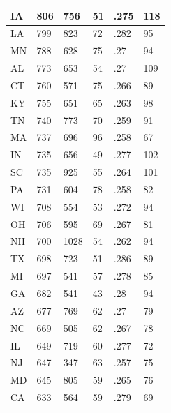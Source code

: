 \begin{table}[htbp]
\begin{tabular}{|l|l|l|l|l|l|}
IA &       806 &       756 &        51 &      .275 &       118 \\ \hline 
LA &       799 &       823 &        72 &      .282 &        95 \\ \hline 
MN &       788 &       628 &        75 &       .27 &        94 \\ \hline 
AL &       773 &       653 &        54 &       .27 &       109 \\ \hline 
CT &       760 &       571 &        75 &      .266 &        89 \\ \hline 
KY &       755 &       651 &        65 &      .263 &        98 \\ \hline 
TN &       740 &       773 &        70 &      .259 &        91 \\ \hline 
MA &       737 &       696 &        96 &      .258 &        67 \\ \hline 
IN &       735 &       656 &        49 &      .277 &       102 \\ \hline 
SC &       735 &       925 &        55 &      .264 &       101 \\ \hline 
PA &       731 &       604 &        78 &      .258 &        82 \\ \hline 
WI &       708 &       554 &        53 &      .272 &        94 \\ \hline 
OH &       706 &       595 &        69 &      .267 &        81 \\ \hline 
NH &       700 &      1028 &        54 &      .262 &        94 \\ \hline 
TX &       698 &       723 &        51 &      .286 &        89 \\ \hline 
MI &       697 &       541 &        57 &      .278 &        85 \\ \hline 
GA &       682 &       541 &        43 &       .28 &        94 \\ \hline 
AZ &       677 &       769 &        62 &       .27 &        79 \\ \hline 
NC &       669 &       505 &        62 &      .267 &        78 \\ \hline 
IL &       649 &       719 &        60 &      .277 &        72 \\ \hline 
NJ &       647 &       347 &        63 &      .257 &        75 \\ \hline 
MD &       645 &       805 &        59 &      .265 &        76 \\ \hline 
CA &       633 &       564 &        59 &      .279 &        69 \\ \hline 

\end{tabular}
\end{table}
